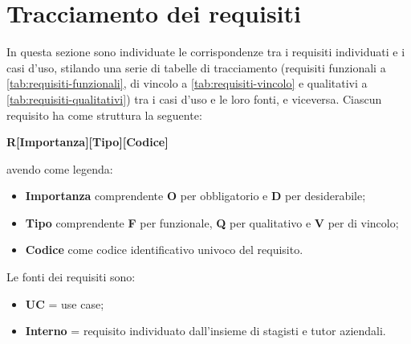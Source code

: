 \section{Tracciamento dei requisiti}

In questa sezione sono individuate le corrispondenze tra i requisiti individuati e i casi d'uso, stilando una serie di tabelle di tracciamento 
(requisiti funzionali a \ref{tab:requisiti-funzionali}, di vincolo a \ref{tab:requisiti-vincolo} e qualitativi a \ref{tab:requisiti-qualitativi}) tra i casi d'uso e le loro fonti, e viceversa.
Ciascun requisito ha come struttura la seguente:
\begin{center}
  \textbf{R[Importanza][Tipo][Codice]}
\end{center}
avendo come legenda:
\begin{itemize}
\item \textbf{Importanza} comprendente \textbf{O} per obbligatorio e \textbf{D} per desiderabile;
\item \textbf{Tipo} comprendente \textbf{F} per funzionale, \textbf{Q} per qualitativo e \textbf{V} per di vincolo;
\item \textbf{Codice} come codice identificativo univoco del requisito.
\end{itemize}
Le fonti dei requisiti sono:
\begin{itemize}
  \item \textbf{UC} = use case;
  \item \textbf{Interno} = requisito individuato dall'insieme di stagisti e tutor aziendali.
\end{itemize}


\renewcommand{\arraystretch}{1.1} %

